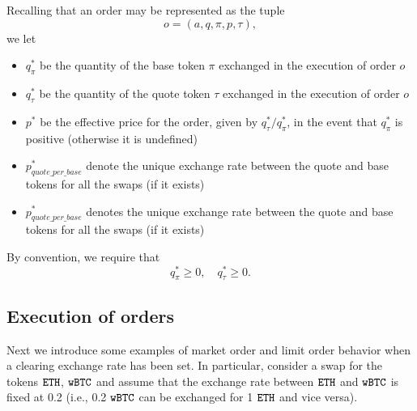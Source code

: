 \documentclass[11pt, reqno]{amsart}
\theoremstyle{definition}
\theoremstyle{remark}
\newcommand{\BTC}{\textnormal{\texttt{wBTC}}}
\newcommand{\ETH}{\textnormal{\texttt{ETH}}}
\begin{document}
Recalling that an order may be represented as the tuple
\[
    o = (a, q, \pi, p, \tau),
\]
we let
\begin{itemize}
    \item $q_\pi^*$ be the quantity of the base token $\pi$ exchanged in the
          execution of order $o$
    \item $q_\tau^*$ be the quantity of the quote token $\tau$ exchanged in
          the execution of order $o$
      \item $p^*$ be the effective price for the order, given by
          $q_\tau^* / q_\pi^*$, in the event that $q_\pi^*$ is positive
          (otherwise it is undefined)
    \item $p_{quote\_per\_base}^*$ denote the unique exchange rate between the
          quote and base tokens for all the swaps (if it exists)
    \item $p_{quote\_per\_base}^*$ denotes the unique exchange rate between the
          quote and base tokens for all the swaps (if it exists)
\end{itemize}
By convention, we require that
\[
    q_\pi^* \geq 0, \quad q_\tau^* \geq 0.
\]

\subsection{Execution of orders}
Next we introduce some examples of market order and limit order behavior when
a clearing exchange rate has been set.
In particular, consider a swap for the tokens $\ETH$, $\BTC$ and assume that
the exchange rate between $\ETH$ and $\BTC$ is fixed at 0.2 (i.e.,
0.2 $\BTC$ can be exchanged for 1 $\ETH$ and vice versa).
\end{document}
